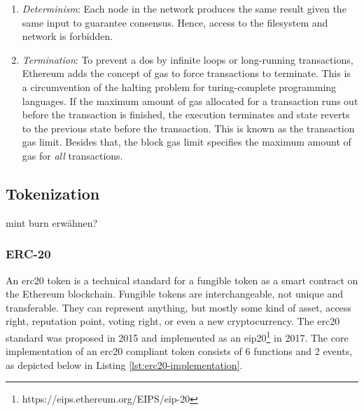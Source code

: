 \begin{enumerate}
    \item \emph{Determinism}: Each node in the network produces the same result given the same input to guarantee consensus. Hence, access to the filesystem and network is forbidden.
    \item \emph{Termination}: To prevent a \acrfull{dos} by infinite loops or long-running transactions, Ethereum adds the concept of gas to force transactions to terminate. This is a circumvention of the halting problem for turing-complete programming languages. If the maximum amount of gas allocated for a transaction runs out before the transaction is finished, the execution terminates and state reverts to the previous state before the transaction. This is known as the transaction gas limit. Besides that, the block gas limit specifies the maximum amount of gas for \emph{all} transactions.
\end{enumerate}

\subsection{Tokenization}
\label{subsec:tokenization}

mint burn erwähnen?

\subsubsection{ERC-20}
\label{subsubsec:erc20}

An \acrfull{erc20} token is a technical standard for a fungible token as a smart contract on the Ethereum blockchain. Fungible tokens are interchangeable, not unique and transferable. They can represent anything, but mostly some kind of asset, access right, reputation point, voting right, or even a new cryptocurrency. The \acrshort{erc20} standard was proposed in 2015 and implemented as an \acrfull{eip20}\footnote{https://eips.ethereum.org/EIPS/eip-20} in 2017. The core implementation of an \acrshort{erc20} compliant token consists of 6 functions and 2 events, as depicted below in Listing \ref{lst:erc20-implementation}.\vspace{3mm}

